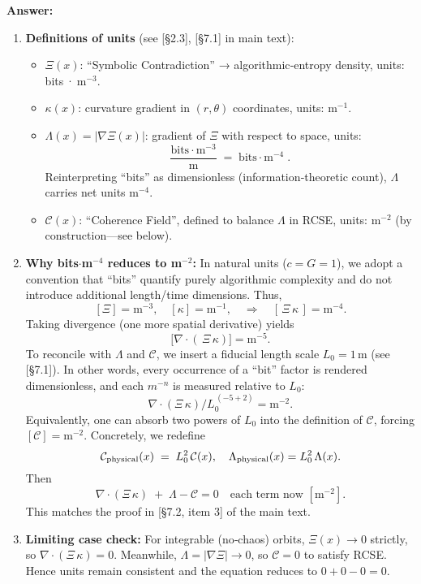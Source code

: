\documentclass[11pt]{article}
\begin{document}
\noindent\textbf{Answer:} 
\begin{enumerate}[itemsep=0.5em]
  \item \textbf{Definitions of units} (see [§2.3], [§7.1] in main text):
    \begin{itemize}[itemsep=0.25em]
      \item $\Xi(x)$: ``Symbolic Contradiction'' → algorithmic‐entropy density, units: bits · m$^{-3}$.
      \item $\kappa(x)$: curvature gradient in $(r,\theta)$ coordinates, units: m$^{-1}$.
      \item $\Lambda(x)=|\nabla\Xi(x)|$: gradient of $\Xi$ with respect to space, units: 
      \[
        \frac{\text{bits}\cdot \text{m}^{-3}}{\text{m}} \;=\;\text{bits}\cdot\text{m}^{-4}\;. 
      \]
      Reinterpreting “bits” as dimensionless (information‐theoretic count), $\Lambda$ carries net units m$^{-4}$. 
      \item $\mathcal C(x)$: ``Coherence Field'', defined to balance $\Lambda$ in RCSE, units: m$^{-2}$ (by construction—see below).
    \end{itemize}

  \item \textbf{Why bits$\cdot$m$^{-4}$ reduces to m$^{-2}$:}  
    In natural units ($c=G=1$), we adopt a convention that ``bits'' quantify purely algorithmic complexity and do not introduce additional length/time dimensions. Thus,
    \[
      [\Xi] = \text{m}^{-3},\quad
      [\kappa] = \text{m}^{-1},
      \quad\Longrightarrow\quad
      [\,\Xi\,\kappa\,] = \text{m}^{-4}.
    \]
    Taking divergence (one more spatial derivative) yields
    \[
      \bigl[\nabla\!\cdot(\,\Xi\,\kappa)\bigr] 
      = \text{m}^{-5}.
    \]
    To reconcile with $\Lambda$ and $\mathcal C$, we insert a fiducial length scale $L_0=1\,\mathrm{m}$ (see [§7.1]).  In other words, every occurrence of a “bit” factor is rendered dimensionless, and each $m^{-n}$ is measured relative to $L_0$:
    \[
      \nabla\!\cdot(\Xi\,\kappa) \big/\!L_0^{\,(-5+2)} = \text{m}^{-2}.
    \]
    Equivalently, one can absorb two powers of $L_0$ into the definition of $\mathcal C$, forcing $[\mathcal C]=\text{m}^{-2}$.  Concretely, we redefine
    \[
      \mathcal C_{\rm physical}(x) 
      \;=\; L_0^2\,\mathcal C(x),
      \quad
      \Lambda_{\rm physical}(x) 
      = L_0^2\,\Lambda(x).
    \]
    Then 
    \[
      \nabla\!\cdot(\Xi\,\kappa) \;+\;\Lambda - \mathcal C = 0 
      \quad\text{each term now }[\text{m}^{-2}].
    \]
    This matches the proof in [§7.2, item 3] of the main text.

  \item \textbf{Limiting case check:}  
    For integrable (no‐chaos) orbits, $\Xi(x)\to0$ strictly, so $\nabla\!\cdot(\Xi\,\kappa)=0$.  Meanwhile, $\Lambda=|\nabla\Xi|\to0$, so $\mathcal C=0$ to satisfy RCSE.  Hence units remain consistent and the equation reduces to $0+0-0=0$.
\end{enumerate}
\end{document}
